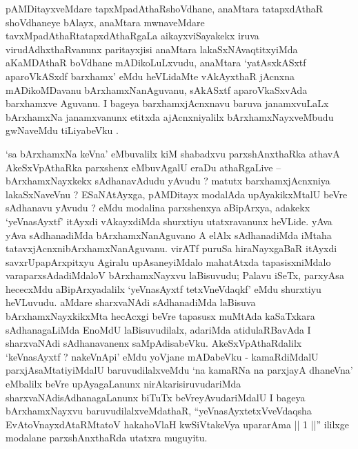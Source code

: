 
\begin{artha}
pAMDitayxveMdare tapxMpadAthaRshoVdhane, anaMtara tatapxdAthaR shoVdhaneye bAlayx, anaMtara mwnaveMdare tavxMpadAthaRtatapxdAthaRgaLa aikayxviSayakekx iruva virudAdhxthaRvanunx paritayxjisi anaMtara lakaSxNAvaqtitxyiMda aKaMDAthaR boVdhane mADikoLuLxvudu, anaMtara `yatAsxkASxtf aparoVkASxdf barxhamx' eMdu heVLidaMte vAkAyxthaR jAcnxna mADikoMDavanu bArxhamxNanAguvanu, sAkASxtf aparoVkaSxvAda barxhamxve Aguvanu. I bageya barxhamxjAcnxnavu baruva janamxvuLaLx bArxhamxNa janamxvanunx etitxda ajAcnxniyalilx bArxhamxNayxveMbudu gwNaveMdu tiLiyabeVku .
\end{artha}


\begin{artha}
`sa bArxhamxNa keVna' eMbuvalilx kiM shabadxvu parxshAnxthaRka athavA AkeSxVpAthaRka parxshenx eMbuvAgalU eraDu athaRgaLive -- bArxhamxNayxkekx sAdhanavAdudu yAvudu ? matutx barxhamxjAcnxniya lakaSxNaveVnu ? ESaNAtAyxga, pAMDitayx modalAda upAyakikxMtalU beVre sAdhanavu yAvudu ? eMdu modalina parxshenxya aBipArxya, adakekx `yeVnasAyxtf' itAyxdi vAkayxdiMda shurxtiyu utatxravanunx heVLide. yAva yAva sAdhanadiMda bArxhamxNanAguvano A elAlx sAdhanadiMda iMtaha tatavxjAcnxnibArxhamxNanAguvanu. virATf puruSa hiraNayxgaBaR itAyxdi savxrUpapArxpitxyu Agiralu upAsaneyiMdalo mahatAtxda tapasisxniMdalo varaparxsAdadiMdaloV bArxhamxNayxvu laBisuvudu; Palavu iSeTx, parxyAsa hececxMdu aBipArxyadalilx `yeVnasAyxtf tetxVneVdaqkf' eMdu shurxtiyu heVLuvudu. aMdare sharxvaNAdi sAdhanadiMda laBisuva bArxhamxNayxkikxMta hecAcxgi beVre tapasusx muMtAda kaSaTxkara sAdhanagaLiMda EnoMdU laBisuvudilalx, adariMda atidulaRBavAda I sharxvaNAdi sAdhanavanenx saMpAdisabeVku. AkeSxVpAthaRdalilx `keVnasAyxtf ? nakeVnApi' eMdu yoVjane mADabeVku - kamaRdiMdalU parxjAsaMtatiyiMdalU baruvudilalxveMdu `na kamaRNa na parxjayA dhaneVna' eMbalilx beVre upAyagaLanunx nirAkarisiruvudariMda sharxvaNAdisAdhanagaLanunx biTuTx beVreyAvudariMdalU I bageya bArxhamxNayxvu baruvudilalxveMdathaR, ``yeVnasAyxtetxVveVdaqsha EvAtoV\s nayxdAtaRMtatoV hakahoVlaH kwSiVtakeVya upararAma || 1 ||'' ililxge modalane parxshAnxthaRda utatxra muguyitu.
\end{artha}

